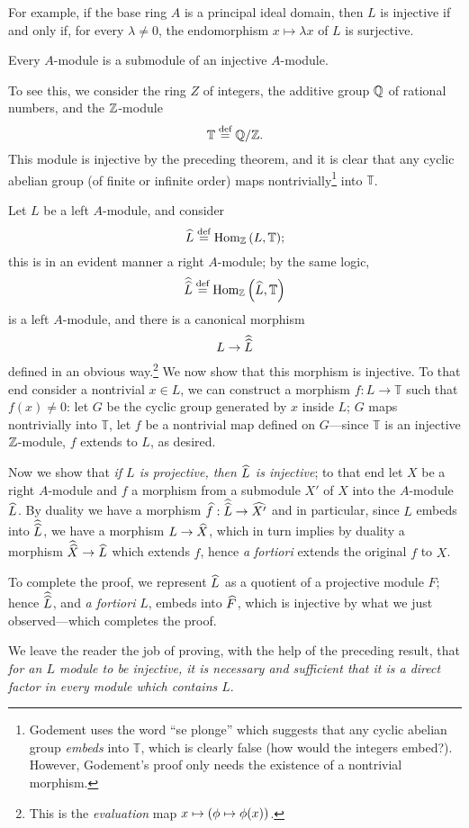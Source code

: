 \documentclass[countbysections]{./homework-math}
\newcommand{\T}{\mathbb{T}}
\begin{document}
For example, if the base ring \(A\) is a principal ideal domain, then \(L\) is
injective if and only if, for every \(\lambda \neq 0\), the endomorphism \(x
\mapsto \lambda x\) of \(L\) is surjective.

\begin{theorem*}[1.2.2]
	Every \(A\)-module is a submodule of an injective \(A\)-module.
\end{theorem*}

To see this, we consider the ring \(Z\) of integers, the additive group \(\mathbb{Q}\)
of rational numbers, and the \(\mathbb{Z}\)-module%
\[%
	\T \eqdef \Q/\Z.
\]%
This module is injective by the preceding theorem, and it is clear that any
cyclic abelian group (of finite or infinite order) maps nontrivially\footnote{%
	Godement uses the word ``se plonge'' which suggests that any cyclic abelian
	group \emph{embeds} into \(\T\), which is clearly false (how would the
	integers embed?). However, Godement's proof only needs the existence of a
	nontrivial morphism.
} into \(\T\).

Let \(L\) be a left \(A\)-module, and consider%
\[%
	\hw{L} \eqdef \Hom_{\Z}\pwrap{L,\T};
\]%
this is in an evident manner a right \(A\)-module; by the same logic,%
\[%
	\hw{\hw{L}} \eqdef \Hom_{\Z}\pwrap{\hw{L},\T}
\]%
is a left \(A\)-module, and there is a canonical morphism%
\[%
	L \to \hw{\hw{L}}
\]%
defined in an obvious way.\footnote{%
	This is the \emph{evaluation} map \(x \mapsto {\left(\phi \mapsto \phi(x)\right)}\).
} We now show that this morphism is injective. To that end consider a
nontrivial \(x \in L\), we can construct a morphism \(f: L \to \T\) such that
\(f(x) \neq 0\): let \(G\) be the cyclic group generated by \(x\) inside \(L\);
\(G\) maps nontrivially into \(\T\), let \(f\) be a nontrivial map defined on
\(G\)---since \(\T\) is an injective \(\mathbb{Z}\)-module, \(f\) extends to \(L\), as
desired.

Now we show that \emph{if \(L\) is projective, then \(\widehat{L}\) is injective};
to that end let \(X\) be a right \(A\)-module and \(f\) a morphism from a
submodule \(X'\) of \(X\) into the \(A\)-module \(\widehat{L}\). By duality we have
a morphism \(\widehat{f}: \widehat{\widehat{L}} \to \widehat{X'}\) and in particular, since \(L\)
embeds into \(\widehat{\widehat{L}}\), we have a morphism \(L \to \widehat{X}\), which in turn
implies by duality a morphism \(\widehat{\widehat{X}} \to \widehat{L}\) which extends \(f\),
hence \emph{a fortiori} extends the original \(f\) to \(X\).

To complete the proof, we represent \(\widehat{L}\) as a quotient of a projective
module \(F\); hence \(\widehat{\widehat{L}}\), and \emph{a fortiori} \(L\), embeds into
\(\widehat{F}\), which is injective by what we just observed---which completes the
proof.

We leave the reader the job of proving, with the help of the preceding result,
that \emph{for an \(L\) module to be injective, it is necessary and sufficient
that it is a direct factor in every module which contains \(L\)}.
\end{document}
